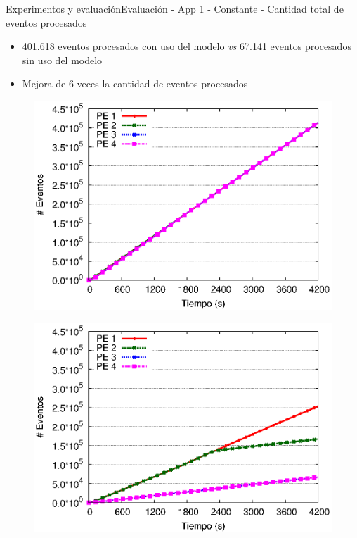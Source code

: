 \begin{frame}{Experimentos y evaluación}{Evaluación - App 1 - Constante - Cantidad total de eventos procesados}

\begin{itemize}
\item 401.618 eventos procesados con uso del modelo \textit{vs} 67.141 eventos procesados sin uso del modelo
\item Mejora de 6 veces la cantidad de eventos procesados
\end{itemize}

\begin{multicols}{2}
\begin{figure}[p]
	\centering
	\includegraphics[scale=0.475]{images/exp/app1/uniform/cm/eventCount.eps}
\end{figure}

\begin{figure}[p]
	\centering
	\includegraphics[scale=0.475]{images/exp/app1/uniform/sm/eventCount.eps}
\end{figure}
\end{multicols}
\end{frame}

